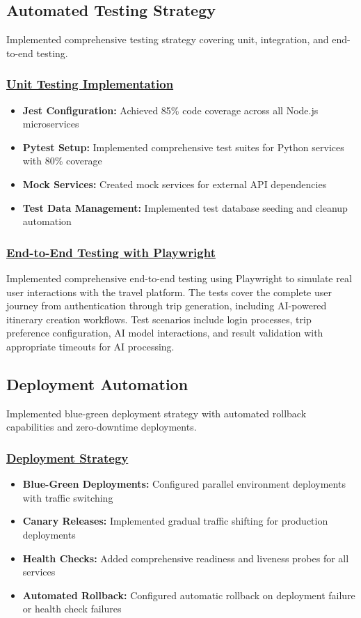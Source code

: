 \subsection{Automated Testing Strategy}
Implemented comprehensive testing strategy covering unit, integration, and end-to-end testing.

\subsubsection*{\underline{Unit Testing Implementation}}
\begin{itemize}
    \item \textbf{Jest Configuration:} Achieved 85\% code coverage across all Node.js microservices
    \item \textbf{Pytest Setup:} Implemented comprehensive test suites for Python services with 80\% coverage
    \item \textbf{Mock Services:} Created mock services for external API dependencies
    \item \textbf{Test Data Management:} Implemented test database seeding and cleanup automation
\end{itemize}

\subsubsection*{\underline{End-to-End Testing with Playwright}}
Implemented comprehensive end-to-end testing using Playwright to simulate real user interactions with the travel platform. The tests cover the complete user journey from authentication through trip generation, including AI-powered itinerary creation workflows. Test scenarios include login processes, trip preference configuration, AI model interactions, and result validation with appropriate timeouts for AI processing.

\subsection{Deployment Automation}
Implemented blue-green deployment strategy with automated rollback capabilities and zero-downtime deployments.

\subsubsection*{\underline{Deployment Strategy}}
\begin{itemize}
    \item \textbf{Blue-Green Deployments:} Configured parallel environment deployments with traffic switching
    \item \textbf{Canary Releases:} Implemented gradual traffic shifting for production deployments
    \item \textbf{Health Checks:} Added comprehensive readiness and liveness probes for all services
    \item \textbf{Automated Rollback:} Configured automatic rollback on deployment failure or health check failures
\end{itemize}

